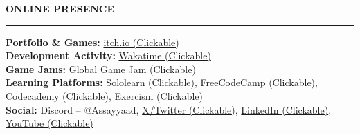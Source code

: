 \documentclass[a4paper,10pt]{article}
\newcommand{\sectionheading}[1]{%
  \addvspace{\medskipamount}%
  {\large\bfseries\MakeUppercase{#1}} %
  \noindent\rule{\linewidth}{0.4pt}%
  \vspace{\smallskipamount}%
}
\begin{document}
\sectionheading{Online Presence}
\textbf{Portfolio \& Games:} \href{https://assayyaad.itch.io}{itch.io (Clickable)} \\
\textbf{Development Activity:} \href{https://wakatime.com/@Assayyaad}{Wakatime (Clickable)} \\
\textbf{Game Jams:} \href{https://globalgamejam.org/users/assayyaad}{Global Game Jam (Clickable)} \\
\textbf{Learning Platforms:} \href{https://www.sololearn.com/en/profile/17032869}{Sololearn (Clickable)}, \href{https://www.freecodecamp.org/Assayyaad}{FreeCodeCamp (Clickable)}, \href{https://www.codecademy.com/profiles/Assayyaad}{Codecademy (Clickable)}, \href{https://exercism.org/profiles/Assayyaad}{Exercism (Clickable)} \\
\textbf{Social:} Discord -- @Assayyaad, \href{https://x.com/Assayyaad}{X/Twitter (Clickable)}, \href{https://linkedin.com/in/Assayyaad}{LinkedIn (Clickable)}, \href{https://youtube.com/@Assayyaad}{YouTube (Clickable)}

\end{document}

